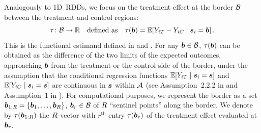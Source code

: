 \documentclass{article}
\begin{document}
Analogously to 1D~RDDs, we focus on the treatment effect at the border \(\mathcal{B}\) between the treatment and control regions:
\begin{equation}
\tau\colon \border \rightarrow \mathbb{R}
\quad\text{defined as}\quad
\tau\del{\sentinel} = \E\sbr{Y_{i\treat} - Y_{i\ctrol} \mid \svec_i = \sentinel}
\,.
\label{eq:functional_estimand}
\end{equation}
This is the functional estimand defined in \cite{imbens2011regression} and \cite{keele_titiunik_2015}.
For any \(\bm{b} \in \mathcal{B}\), \(\tau(\bm{b})\) can be obtained as the difference of the two limits of the expected outcomes, approaching \(\bm{b}\) from the treatment or the control side of the border, under the assumption that the conditional regression functions \(\E\sbr{Y_{i\treat} \mid \svec_i=\svec}\) and \(\E\sbr{Y_{i\ctrol} \mid \svec_i=\svec}\) are continuous in \(\bm{s}\) within \(\mathcal{A}\)
(see Assumption~2.2.2 in \cite{imbens2011regression} and Assumption~1 in \cite{keele_titiunik_2015}).
For computational purposes, we represent the border as a set \(\bm{b}_{1:R}=\left\lbrace\bm{b}_1,\ldots,\bm{b}_R\right\rbrace\), \(\bm{b}_r \in \mathcal{B}\) of \(R\) ``sentinel points'' along the border.
We denote by \(\tau(\bm{b}_{1:R})\) the \(R\)-vector with \(r^\mathrm{th}\) entry \(\tau(\bm{b}_r)\) of the treatment effect evaluated at \(\bm{b}_r\).
\end{document}
